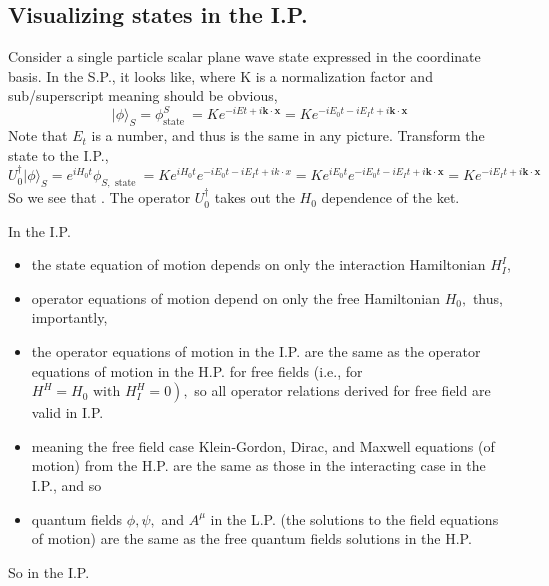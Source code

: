 \subsection{Visualizing states in the I.P.}
Consider a single  particle scalar plane wave state expressed in the coordinate basis. In the S.P., it looks like, where K is a normalization factor and sub/superscript meaning should be obvious,
$$
|\phi\rangle_{S}=\phi_{\text {state }}^{S}=K e^{-i E t+i \mathbf{k} \cdot \mathbf{x}}=K e^{-i E_{0} t-i E_{I} t+i \mathbf{k} \cdot \mathbf{x}}
$$
Note that $E_{t}$ is a number, and thus is the same in any picture. Transform the state to the I.P.,
$$
U_{0}^{\dagger}|\phi\rangle_{S}=e^{i H_{0} t} \phi_{S, \text { state }}=K e^{i H_{0} t} e^{-i E_{0} t-i E_{I} t+i k \cdot x}=K e^{i E_{0} t} e^{-i E_{0} t-i E_{I} t+i \mathbf{k} \cdot \mathbf{x}}=K e^{-i E_{I} t+i \mathbf{k} \cdot \mathbf{x}}
$$
So we see that . The operator $U_{0}^{\dagger}$ takes out the $H_{0}$ dependence of the ket.

In the I.P.
\begin{itemize}
    \item the state equation of motion depends on only the interaction Hamiltonian $H_I^I$, \item operator equations of motion depend on only the free Hamiltonian $H_{0},$ thus, importantly, 
    \item the operator equations of motion in the I.P. are the same as the operator equations of motion in the H.P. for free fields (i.e., for $\left.H^{H}=H_{0} \text { with } H_{I}^{H}=0\right),$ so all operator relations derived for free field are valid in I.P.
    \item meaning the free field case Klein-Gordon, Dirac, and Maxwell equations (of motion) from the H.P. are the same as those in the interacting case in the I.P., and so
    \item quantum fields $\phi, \psi,$ and $A^{\mu}$ in the L.P. (the solutions to the field equations of motion) are the same as the free quantum fields solutions in the H.P.
\end{itemize}
So in the I.P. 

